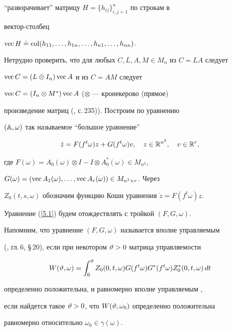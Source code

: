 ``разворачивает'' матрицу $H=\{h_{ij}\}_{i,j=1}^n$ по строкам в


вектор-столбец


$\operatorname{vec} H\doteq\operatorname{col}(h_{11},\dotsc,h_{1n},\dotsc,h_{n1},\dotsc,h_{nn})$.


Нетрудно проверить, что для любых $C,L,A,M\in M_n$ из $C=LA$ следует


$\operatorname{vec} C=(L\otimes I_n)\operatorname{vec} A$ и из $C=AM$ следует


$\operatorname{vec} C=(I_n\otimes M^*)\operatorname{vec} A$ ($\otimes$ --- кронекерово (прямое)


произведение матриц (\cite{Lan}, с.\,235)). Построим по уравнению


$(\Bbb A,\omega)$ так называемое ``большое уравнение'' \cite{PT95}


\begin{equation}


\label{5.1}


\Dot z=F(f^t\omega)z+G(f^t\omega)v,\quad z\in\R^{n^2},\quad v\in\R^r,


\end{equation}


где $F(\omega)=A_0(\omega)\otimes I-I\otimes A_0^*(\omega)\in M_{n^2}$,


$G(\omega)=(\operatorname{vec} A_1(\omega),\dotsc,\operatorname{vec} A_r(\omega))\in M_{n^2\times r}$. Через


$Z_0(t,s,\omega)$ обозначим функцию Коши уравнения $\Dot z=F(f^t\omega)z$.


Уравнение (\ref{5.1}) будем отождествлять с тройкой $(F,G,\omega)$.





Напомним, что уравнение $(F,G,\omega)$ называется вполне управляемым


(\cite{K}, гл.\,6, \S\,20), если при некотором $\vartheta>0$ матрица управляемости


\begin{equation}


\label{W}


W(\vt,\omega)=\int_0^{\vt}Z_0(0,t,\omega)G(f^t\omega)G^*(f^t\omega)Z_0^*(0,t,\omega)\,dt


\end{equation}


определенно положительна, и равномерно вполне управляемым \cite{T83},


если найдется такое $\vartheta>0$, что $W(\vartheta,\omega_0)$ определенно положительна


равномерно относительно $\omega_0\in\overline\gamma(\omega)$.





